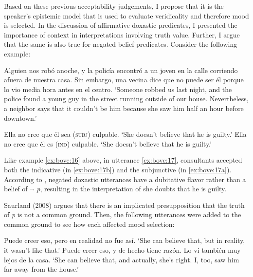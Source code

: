 \documentclass[output=paper,colorlinks,citecolor=brown,
]{langscibook}
\begin{document}
Based on these previous acceptability judgements, I propose that it is the speaker's epistemic model that is used to evaluate veridicality and therefore mood is selected. In the discussion of affirmative doxastic predicates, I presented the importance of context in interpretations involving truth value. Further, I argue that the same is also true for negated belief predicates. Consider the following example:

\begin{exe} %
    \ex\label{ex:bove:17} 
	Alguien nos robó anoche, y la policía encontró a un joven en la calle corriendo afuera de nuestra casa. Sin embargo, una vecina dice que no puede ser él porque lo vio media hora antes en el centro.
 \glt `Someone robbed us last night, and the police found a young guy in the street running outside of our house. Nevertheless, a neighbor says that it couldn’t be him because she saw him half an hour before downtown.'
 
    \begin{xlist} %
        \ex \label{ex:bove:17a}
          Ella no cree que él sea (\textsc{subj}) culpable.%
                   \glt `She doesn’t believe that he is guilty.'
        \ex\label{ex:bove:17b}
           Ella no cree que él es (\textsc{ind}) culpable.
             \glt `She doesn’t believe that he is guilty.'
\end{xlist}
\end{exe}



Like example \ref{ex:bove:16} above, in utterance \ref{ex:bove:17}, consultants accepted both the indicative (in \ref{ex:bove:17b}) and the subjunctive (in \ref{ex:bove:17a}). According to \citet{Mari2016}, negated doxastic utterances have a dubitative flavor rather than a belief of $\neg$\textit{ p}, resulting in the interpretation of she doubts that he is guilty. 


Saurland (2008) argues that there is an implicated presupposition that the truth of \textit{p} is not a common ground. Then, the following utterances were added to the common ground to see how each affected mood selection:


\begin{exe} %
    \ex\label{ex:bove:18} 
    \begin{xlist} %
        \ex \label{ex:bove:18a}
           Puede creer eso, pero en realidad no fue así.  %
                   \glt `She can believe that, but in reality, it wasn’t like that.'
        \ex\label{ex:bove:18b}
            Puede creer eso, y de hecho tiene razón. Lo vi también muy lejos de la casa.
                   \glt `She can believe that, and actually, she’s right. I, too, saw him far away from the house.'
\end{xlist}
\end{exe}
\end{document}
